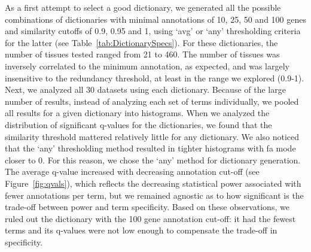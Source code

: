 \documentclass{bmcart}
\begin{document}
As a first attempt to select a good dictionary, we generated all the possible combinations of dictionaries with minimal annotations of 10, 25, 50 and 100 genes and similarity cutoffs of 0.9, 0.95 and 1, using `avg' or `any'
thresholding criteria for the latter (see Table~\ref{tab:DictionarySpecs}). For these dictionaries, the number of tissues tested ranged from 21 to 460. The number of tissues was inversely correlated to the minimum annotation, as
expected, and was largely insensitive to the redundancy threshold, at least in the range we explored (0.9-1). Next, we analyzed all 30 datasets using each dictionary. Because of the large number of results, instead of analyzing each set of terms individually, we pooled all results for a given dictionary into histograms. When we analyzed the distribution of significant q-values for the dictionaries, we found that the similarity threshold mattered relatively little for any dictionary. We also noticed that the `any' thresholding method resulted in tighter histograms with fa mode closer to 0. For this reason, we chose the `any' method for dictionary generation. The average q-value increased with decreasing annotation cut-off (see Figure~\ref{fig:qvals}), which reflects the decreasing statistical power associated with fewer annotations per term, but we remained agnostic as to how significant is the trade-off between power and term
specificity. Based on these observations, we ruled out the dictionary with the 100 gene annotation cut-off: it had the fewest terms and its q-values were not low enough to compensate the trade-off in specificity.
\end{document}

